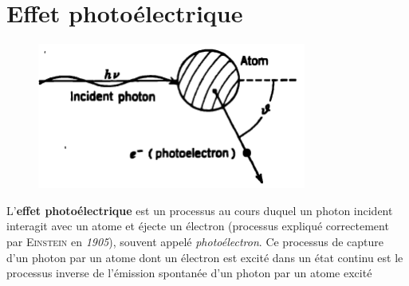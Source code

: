 \section{Effet photoélectrique}%
	\begin{figure}
	\vspace{-5mm}
	\includegraphics[scale=0.5]{ch4/image7}
	\end{figure}
L'\textbf{effet photoélectrique} est un processus au cours duquel un photon incident interagit avec 
un atome et éjecte un électron (processus expliqué correctement par \textsc{Einstein} en 
\textit{1905}), souvent appelé \textit{photoélectron}. Ce processus de capture d'un photon par un
atome dont un électron est excité dans un état continu est le processus inverse de l'émission spontanée d'un photon par un atome excité


